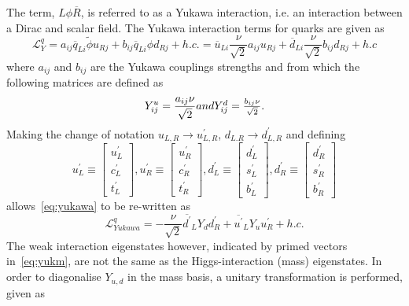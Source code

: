 The term, $L\phi\overline{R}$, is referred to as a Yukawa interaction, i.e. an interaction between a Dirac and scalar field.  The Yukawa interaction terms for quarks are given as
\begin{equation}
  \mathcal{L}^{q}_{Y} = a_{ij}\overline{q}_{Li}\tilde{\phi}u_{Rj} + b_{ij}\overline{q}_{Li}\phi d_{Rj} + h.c.%
  =%
   \overline{u}_{Li}\frac{\nu}{\sqrt{2}}a_{ij}u_{Rj} + \overline{d}_{Li}\frac{\nu}{\sqrt{2}} b_{ij}d_{Rj} + h.c
\label{eq:yukawa}
\end{equation}
where $a_{ij}$ and $b_{ij}$ are the Yukawa couplings strengths and from which the following matrices are defined as
\begin{equation}
  Y^{u}_{ij} = \frac{a_{ij}\nu}{\sqrt{2}} $$and$$ \\
  Y^{d}_{ij} = \frac{b_{ij}\nu}{\sqrt{2}}.
  \label{mass}
\end{equation}
Making the change of notation $u_{L,R}\to u^{\prime}_{L,R}$, $d_{L.R}\to d^{\prime}_{L,R}$ and defining
\begin{equation}
  u^{\prime}_{L} \equiv \begin{bmatrix}u^{\prime}_{L}\\c_{L}^{\prime}\\t^{\prime}_{L}\end{bmatrix},
  u^{\prime}_{R} \equiv \begin{bmatrix}u^{\prime}_{R}\\c_{R}^{\prime}\\t^{\prime}_{R}\end{bmatrix},
  d^{\prime}_{L} \equiv \begin{bmatrix}d^{\prime}_{L}\\s_{L}^{\prime}\\b^{\prime}_{L}\end{bmatrix},
  d^{\prime}_{R} \equiv \begin{bmatrix}d^{\prime}_{R}\\s_{R}^{\prime}\\b^{\prime}_{R}\end{bmatrix}
  \label{eq:yukdef1}
\end{equation}
allows~\autoref{eq:yukawa} to be re-written as
\begin{equation}
  \mathcal{L}^{q}_{Yukawa} = -\frac{\nu}{\sqrt{2}}{\overline{d^{\prime}}_{L}Y_{d}d^{\prime}_{R} + \overline{u^{\prime}}_{L}Y_{u}u^{\prime}_{R} + h.c.}
  \label{eq:yukm}
\end{equation}
The weak interaction eigenstates however, indicated by primed vectors in~\autoref{eq:yukm}, are not the same as the Higgs-interaction (mass) eigenstates. In order to diagonalise $Y_{u,d}$ in the mass basis, a unitary transformation is performed, given as

